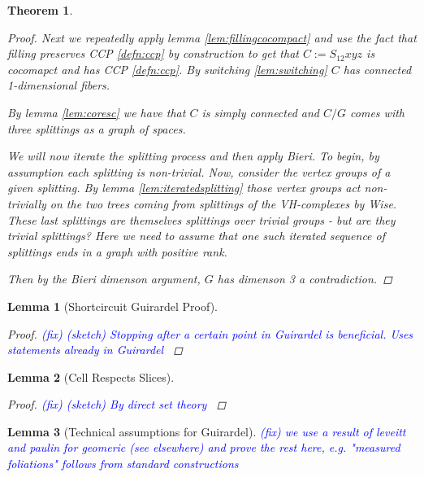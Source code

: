 \documentclass{article}
\newcommand{\fix}[1]{\textcolor{blue}{(fix) #1}}
\theoremstyle{mystyle}
\newtheorem{thm}{Theorem}[section]
\newtheorem{lem}{Lemma}[section]
\theoremstyle{remark}
\begin{document}
\begin{thm}
\begin{proof}
        Next we repeatedly apply lemma \ref{lem:fillingcocompact} and use the fact that filling preserves CCP \ref{defn:ccp} by construction to get that \(C:= S_{12}xyz\) is cocomapct and has CCP \ref{defn:ccp}. By switching \ref{lem:switching} \(C\) has connected 1-dimensional fibers. 

        By lemma \ref{lem:coresc} we have that \(C\) is simply connected and \(C/G\) comes with three splittings as a graph of spaces.

        We will now iterate the splitting process and then apply Bieri. To begin, by assumption each splitting is non-trivial. Now, consider the vertex groups of a given splitting. By lemma \ref{lem:iteratedsplitting} those vertex groups act non-trivially on the two trees coming from splittings of the VH-complexes by Wise. These last splittings are themselves splittings over trivial groups - but are they trivial splittings? Here we need to assume that one such iterated sequence of splittings ends in a graph with positive rank.
        
        Then by the Bieri dimenson argument, \(G\) has dimenson 3 a contradiction.
    \end{proof}
\end{thm}

\begin{lem}
    [Shortcircuit Guirardel Proof]
    \label{lem:shortcircuit} 
    \begin{proof}
        \fix{
            (sketch) 
            Stopping after a certain point in Guirardel is beneficial. Uses statements already in Guirardel
        }
    \end{proof}
\end{lem}
\begin{lem}
    [Cell Respects Slices]
    \label{lem:cellrespecslice} 
    \begin{proof}
        \fix{
            (sketch) By direct set theory 
        }
    \end{proof}
\end{lem}
\begin{lem}
    [Technical assumptions for Guirardel]
    \label{lem:measuredetc} 
    \fix{
        we use a result of leveitt and paulin for geomeric (see elsewhere) and prove the rest here, e.g. "measured foliations" follows from standard constructions
    }

\end{lem}
\end{document}
